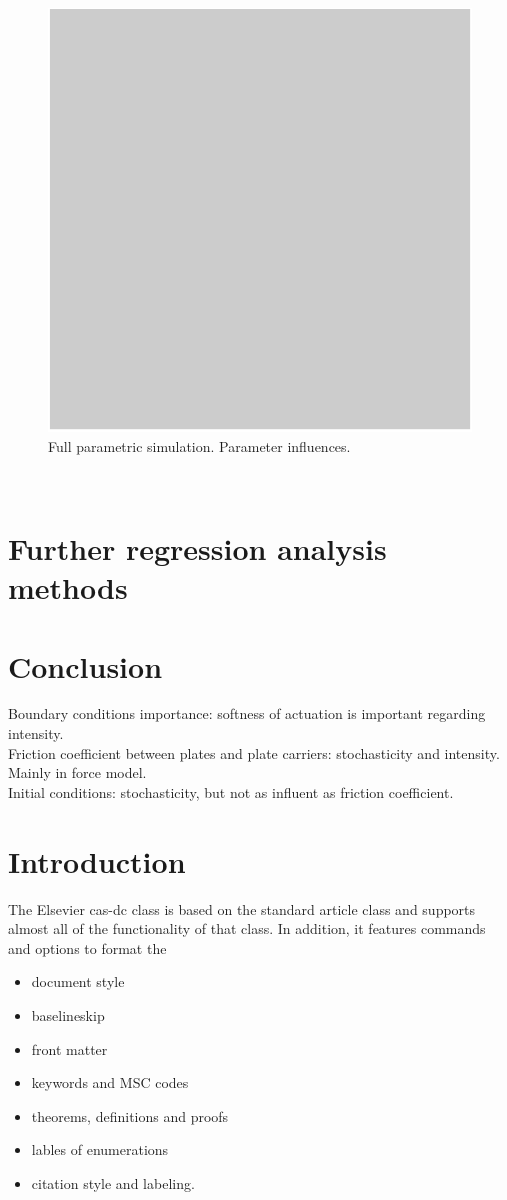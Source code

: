 \documentclass[a4paper,fleqn]{cas-dc}
\begin{document}
\begin{figure}
	\centering
	\includegraphics[scale=.75]{figs/Fig1.pdf}
	\caption{Full parametric simulation. Parameter influences.}
	\label{fig:full parametric}
\end{figure}\\
\section{Further regression analysis methods}

\section{Conclusion}
Boundary conditions importance: softness of actuation is important regarding intensity. \\
Friction coefficient between plates and plate carriers: stochasticity and intensity. Mainly in force model.  \\
Initial conditions: stochasticity, but not as influent as friction coefficient. \\


\section{Introduction}

The Elsevier cas-dc class is based on the
standard article class and supports almost all of the functionality of
that class. In addition, it features commands and options to format the
\begin{itemize} \item document style \item baselineskip \item front
matter \item keywords and MSC codes \item theorems, definitions and
proofs \item lables of enumerations \item citation style and labeling.
\end{itemize}
\end{document}
